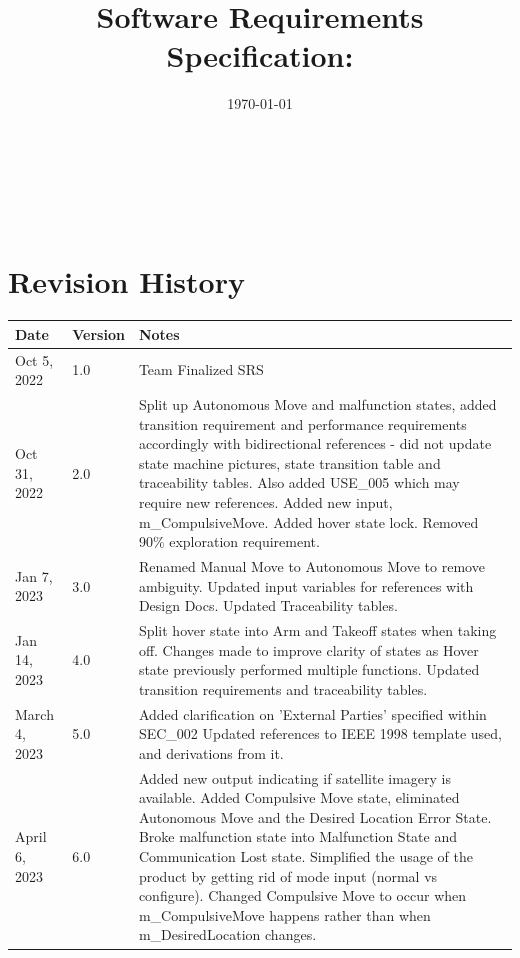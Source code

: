 \documentclass{article}
\begin{document}
\title{Software Requirements Specification: \progname} 
\author{\authname}
\date{\today}
	
\maketitle

~\newpage


\tableofcontents

~\newpage

\section*{Revision History}

\begin{tabularx}{\textwidth}{p{3cm}p{2cm}X} 
\toprule {\bf Date} & {\bf Version} & {\bf Notes}\\
\midrule
Oct 5, 2022 & 1.0 & Team Finalized SRS\\

\bottomrule
Oct 31, 2022 & 2.0 & Split up Autonomous Move and malfunction states, added transition requirement and performance requirements accordingly with bidirectional references - did not update state machine pictures, state transition table and traceability tables. Also added USE\_005 which may require new references. Added new input, m\_CompulsiveMove. Added hover state lock. Removed 90\% exploration requirement. 
\\

\bottomrule
Jan 7, 2023 & 3.0 & Renamed Manual Move to Autonomous Move to remove ambiguity. Updated input variables for references with Design Docs. Updated Traceability tables.
\\

\bottomrule
Jan 14, 2023 & 4.0 & Split hover state into Arm and Takeoff states when taking off. Changes made to improve clarity of states as Hover state previously performed multiple functions. Updated transition requirements and traceability tables.
\\

\bottomrule
March 4, 2023 & 5.0 & Added clarification on 'External Parties' specified within SEC\_002 Updated references to IEEE 1998 template used, and derivations from it.
\\
\bottomrule
April 6, 2023 & 6.0 & Added new output indicating if satellite imagery is available. Added Compulsive Move state, eliminated Autonomous Move and the Desired Location Error State. Broke malfunction state into Malfunction State and Communication Lost state. Simplified the usage of the product by getting rid of mode input (normal vs configure). Changed Compulsive Move to occur when m\_CompulsiveMove happens rather than when m\_DesiredLocation changes.
\end{tabularx}
\end{document}
